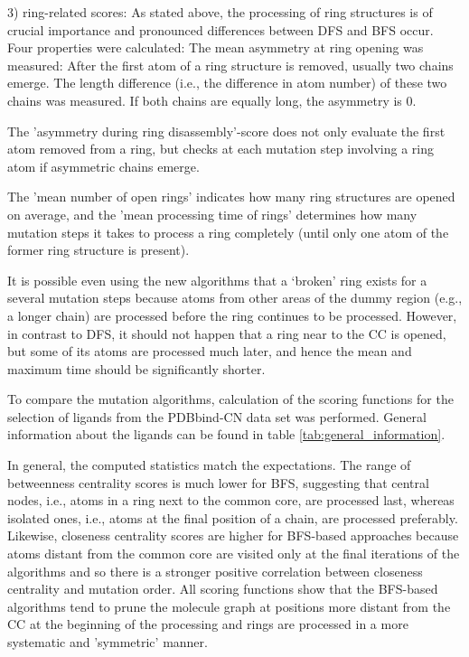 3) ring-related scores: As stated above, the processing of ring structures
is of crucial importance and pronounced differences between DFS and
BFS occur. Four properties were calculated: The mean asymmetry at
ring opening was measured: After the first atom of a ring structure
is removed, usually two chains emerge. The length difference (i.e.,
the difference in atom number) of these two chains was measured. If
both chains are equally long, the asymmetry is 0. 

The 'asymmetry during ring disassembly'-score does not only evaluate
the first atom removed from a ring, but checks at each mutation step
involving a ring atom if asymmetric chains emerge.

The 'mean number of open rings' indicates how many ring structures
are opened on average, and the 'mean processing time of rings' determines
how many mutation steps it takes to process a ring completely (until
only one atom of the former ring structure is present).

It is possible even using the new algorithms
that a \textquoteleft broken\textquoteright{} ring exists for a several mutation steps
 because atoms from other areas of the dummy region (e.g.,
a longer chain) are processed before the ring continues to be processed. However, in contrast to DFS,
it should not happen that a ring near to the CC is opened, but some of its atoms are processed much later, and hence the mean and maximum time should be significantly shorter. 

To compare the mutation algorithms, calculation of the scoring functions for the selection of ligands from the PDBbind-CN data set was performed. General information about the ligands can be found in table \ref{tab:general_information}. 

In general, the computed statistics match the expectations. The range of betweenness centrality scores is much lower for BFS, suggesting that central nodes, i.e., atoms in a ring next to the common core, are processed last, whereas isolated ones, i.e., atoms at the final position of a chain, are processed preferably.
Likewise, closeness centrality scores are higher for BFS-based approaches because atoms distant from the common core are visited only at the final iterations of the algorithms and so there is a stronger positive correlation between closeness centrality and  mutation order. 
All scoring functions show that the BFS-based algorithms tend to prune the molecule graph at positions more distant from the CC at the beginning of the processing and rings are processed in a more systematic and 'symmetric' manner.

